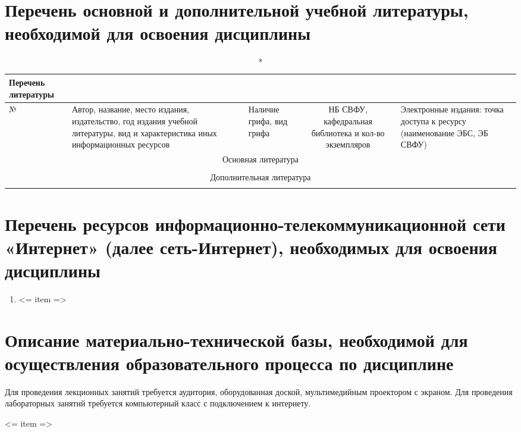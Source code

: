 \documentclass[a4paper,12pt]{article}
\begin{document}


\newpage
\section{Перечень основной и дополнительной учебной литературы, необходимой для освоения дисциплины}

  \begin{longtable}{|l|p{7cm}|p{18mm}|c|p{32mm}|}
  \caption*{Перечень литературы}\\
  \hline
  № & 
  \centering\small\arraybackslash Автор, название, место издания, издательство, год издания учебной литературы, вид и характеристика иных информационных ресурсов &
  \multicolumn{1}{p{18mm}|}{\centering\small\arraybackslash Наличие грифа, вид грифа} &
  \multicolumn{1}{p{21mm}|}{\centering\small\arraybackslash НБ СВФУ, кафедральная библиотека и кол-во экземпляров} & 
  \centering\small\arraybackslash Электронные издания: точка доступа к ресурсу (наименование ЭБС, ЭБ СВФУ)\\
  \hline
  \multicolumn{5}{|c|}{Основная литература}\\
  \hline
  \\
  \hline
  \multicolumn{5}{|c|}{Дополнительная литература}\\
  \hline
  \\
  \hline
  \end{longtable}
  
\section{Перечень ресурсов информационно-телекоммуникационной сети «Интернет» (далее сеть-Интернет), необходимых для освоения дисциплины}
\begin{enumerate}
  \item <= item => 
\end{enumerate}


\newpage
\section{Описание материально-технической базы, необходимой для осуществления образовательного процесса по дисциплине}
       Для проведения лекционных занятий требуется аудитория, оборудованная доской,  мультимедийным проектором с экраном. 
       Для проведения лабораторных занятий требуется компьютерный класс с подключением к интернету.
       \par <= item => 
\end{document}
